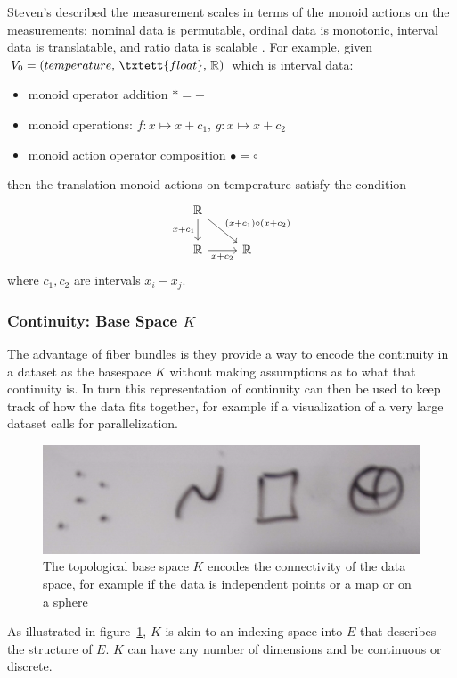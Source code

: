 \documentclass[../main.tex]{subfiles}
\begin{document}
Steven's described the measurement scales\cite{stevensTheoryScalesMeasurement1946,leaFormalizationMeasurementScale} in terms of the monoid actions on the measurements: nominal data is permutable, ordinal data is monotonic, interval data is translatable, and ratio data is scalable \cite{weissteinSimilarityTransformation}. For example, given  $V_0 = (temperature,\, \txtett{float},\, \mathbb{R})$ which is interval data:
\begin{itemize}
    \item monoid operator addition $\ast = +$
    \item monoid operations: $f: x\mapsto x + c_1 $, $g: x\mapsto x + c_2$
    \item monoid action operator composition $\bullet = \circ$
\end{itemize}
then the translation monoid actions on temperature satisfy the condition
\begin{equation}
    \begin{tikzcd}
        \mathbb{R} \arrow[rd, "(x+c_1)\circ(x+c_2)"] \arrow[d, "x+c_1"'] &            \\
        \mathbb{R} \arrow[r, "x+c_2"']                                   & \mathbb{R}
    \end{tikzcd}
\end{equation}
where $c_1, c_2$ are intervals $x_i-x_j$. 


\subsubsection{Continuity: Base Space $K$} 
\label{sec:data_base}
The advantage of fiber bundles is they provide a way to encode the continuity in a dataset as the basespace $K$ without making assumptions as to what that continuity is. In turn this representation of continuity can then be used to keep track of how the data fits together, for example if a visualization of a very large dataset calls for parallelization.  

\begin{figure}[H]
    \includegraphics[width=.5\textwidth]{figures/math/k_different_types.png}
    \caption{The topological base space $K$ encodes the connectivity of the data space, for example if the data is independent points or a map or on a sphere}
    \label{fig:base_space_types}
\end{figure}
As illustrated in figure~\ref{fig:base_space_types}, $K$ is akin to an indexing space into $E$ that describes the structure of $E$.  $K$ can have any number of dimensions and be continuous or discrete. 
\end{document}
